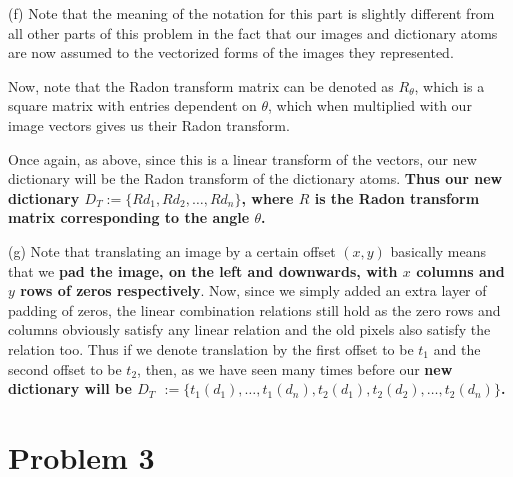 \documentclass[a4paper,14pt]{article}
\numberwithin{definition}{section}
\numberwithin{mytheorem}{subsection}
\begin{document}
 (f) Note that the meaning of the notation for this part is slightly different from all other parts of this problem in the fact that our images and dictionary atoms are now assumed to the vectorized forms of the images they represented. 
 
 Now, note that the Radon transform matrix can be denoted as $R_{\theta}$, which is a square matrix with entries dependent on $\theta$, which when multiplied with our image vectors gives us their Radon transform.

 Once again, as above, since this is a linear transform of the vectors, our new dictionary will be the Radon transform of the dictionary atoms. \textbf{Thus our new dictionary $D_T := \{Rd_1, Rd_2, \hdots, Rd_n\}$, where $R$ is the Radon transform matrix corresponding to the angle $\theta$.}

(g) Note that translating an image by a certain offset $(x, y)$ basically means that we \textbf{pad the image, on the left and downwards, with $x$ columns and $y$ rows of zeros respectively}. Now, since we simply added an extra layer of padding of zeros, the linear combination relations still hold as the zero rows and columns obviously satisfy any linear relation and the old pixels also satisfy the relation too. Thus if we denote translation by the first offset to be $t_1$ and the second offset to be $t_2$, then, as we have seen many times before our \textbf{new dictionary will be $D_T$
$:= \{t_1(d_1), \hdots, t_1(d_n), t_2(d_1), t_2(d_2), \hdots, t_2(d_n)\}$.}

\section{Problem 3}
\end{document}
